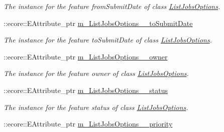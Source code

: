 \begin{DoxyCompactItemize}
\begin{DoxyCompactList}\small\item\em The instance for the feature fromSubmitDate of class \hyperlink{classTMS__Data_1_1ListJobsOptions}{ListJobsOptions}. \item\end{DoxyCompactList}\item 
\hypertarget{classTMS__Data_1_1TMS__DataPackage_af7f41d33a61a64227770ec40b36188ce}{
::ecore::EAttribute\_\-ptr \hyperlink{classTMS__Data_1_1TMS__DataPackage_af7f41d33a61a64227770ec40b36188ce}{m\_\-ListJobsOptions\_\-\_\-toSubmitDate}}
\label{classTMS__Data_1_1TMS__DataPackage_af7f41d33a61a64227770ec40b36188ce}

\begin{DoxyCompactList}\small\item\em The instance for the feature toSubmitDate of class \hyperlink{classTMS__Data_1_1ListJobsOptions}{ListJobsOptions}. \item\end{DoxyCompactList}\item 
\hypertarget{classTMS__Data_1_1TMS__DataPackage_ae69bcfbd24ee238eb99cc87e1fb47f95}{
::ecore::EAttribute\_\-ptr \hyperlink{classTMS__Data_1_1TMS__DataPackage_ae69bcfbd24ee238eb99cc87e1fb47f95}{m\_\-ListJobsOptions\_\-\_\-owner}}
\label{classTMS__Data_1_1TMS__DataPackage_ae69bcfbd24ee238eb99cc87e1fb47f95}

\begin{DoxyCompactList}\small\item\em The instance for the feature owner of class \hyperlink{classTMS__Data_1_1ListJobsOptions}{ListJobsOptions}. \item\end{DoxyCompactList}\item 
\hypertarget{classTMS__Data_1_1TMS__DataPackage_a8e5694025826d6dfc9f6f4b986e6f1d9}{
::ecore::EAttribute\_\-ptr \hyperlink{classTMS__Data_1_1TMS__DataPackage_a8e5694025826d6dfc9f6f4b986e6f1d9}{m\_\-ListJobsOptions\_\-\_\-status}}
\label{classTMS__Data_1_1TMS__DataPackage_a8e5694025826d6dfc9f6f4b986e6f1d9}

\begin{DoxyCompactList}\small\item\em The instance for the feature status of class \hyperlink{classTMS__Data_1_1ListJobsOptions}{ListJobsOptions}. \item\end{DoxyCompactList}\item 
\hypertarget{classTMS__Data_1_1TMS__DataPackage_a21c9762ef95d661bdce2688837122bc1}{
::ecore::EAttribute\_\-ptr \hyperlink{classTMS__Data_1_1TMS__DataPackage_a21c9762ef95d661bdce2688837122bc1}{m\_\-ListJobsOptions\_\-\_\-priority}}
\label{classTMS__Data_1_1TMS__DataPackage_a21c9762ef95d661bdce2688837122bc1}


\end{DoxyCompactItemize}
